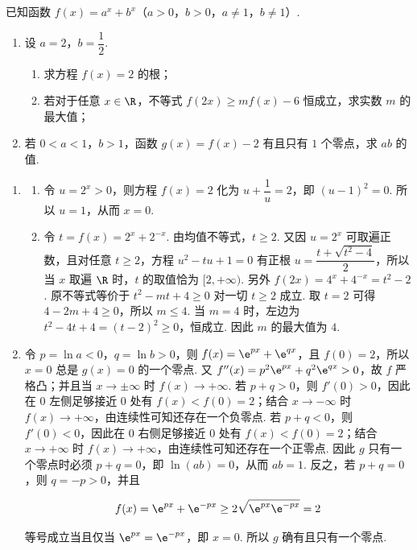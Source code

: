 \begin{problem}
已知函数 \(f(x)=a^x+b^x\)（\(a>0\)，\(b>0\)，\(a\ne1\)，\(b\ne1\)）.

\begin{enumerate}
\item 设 \(a=2\)，\(b=\dfrac12\).

\begin{enumerate}
\item 求方程 \(f(x)=2\) 的根；
\item 若对于任意 \(x\in\R\)，不等式 \(f(2x)\ge mf(x)-6\) 恒成立，求实数 \(m\) 的最大值；
\end{enumerate}

\item 若 \(0<a<1\)，\(b>1\)，函数 \(g(x)=f(x)-2\) 有且只有 \(1\) 个零点，求 \(ab\) 的值.
\end{enumerate}
\end{problem}

\begin{solution}
\begin{enumerate}
\item
\begin{enumerate}
\item 令 \(u=2^x>0\)，则方程 \(f(x)=2\) 化为 \(u+\dfrac1u=2\)，即 \((u-1)^2=0\). 所以 \(u=1\)，从而 \(x=0\).
\item 令 \(t=f(x)=2^x+2^{-x}\). 由均值不等式，\(t\ge2\). 又因 \(u=2^x\) 可取遍正数，且对任意 \(t\ge2\)，方程 \(u^2-tu+1=0\) 有正根 \(u=\dfrac{t+\sqrt{t^2-4}}2\)，所以当 \(x\) 取遍 \(\R\) 时，\(t\) 的取值恰为 \([2,+\infty)\). 另外 \(f(2x)=4^x+4^{-x}=t^2-2\). 原不等式等价于 \(t^2-mt+4\ge0\) 对一切 \(t\ge2\) 成立. 取 \(t=2\) 可得 \(4-2m+4\ge0\)，所以 \(m\le4\). 当 \(m=4\) 时，左边为 \(t^2-4t+4=(t-2)^2\ge0\)，恒成立. 因此 \(m\) 的最大值为 \(4\).
\end{enumerate}
\item 令 \(p=\ln a<0\)，\(q=\ln b>0\)，则 \(f(x)=\e^{px}+\e^{qx}\)，且 \(f(0)=2\)，所以 \(x=0\) 总是 \(g(x)=0\) 的一个零点. 又 \(f''(x)=p^2\e^{px}+q^2\e^{qx}>0\)，故 \(f\) 严格凸；并且当 \(x\to\pm\infty\) 时 \(f(x)\to+\infty\). 若 \(p+q>0\)，则 \(f'(0)>0\)，因此在 \(0\) 左侧足够接近 \(0\) 处有 \(f(x)<f(0)=2\)；结合 \(x\to-\infty\) 时 \(f(x)\to+\infty\)，由连续性可知还存在一个负零点. 若 \(p+q<0\)，则 \(f'(0)<0\)，因此在 \(0\) 右侧足够接近 \(0\) 处有 \(f(x)<f(0)=2\)；结合 \(x\to+\infty\) 时 \(f(x)\to+\infty\)，由连续性可知还存在一个正零点. 因此 \(g\) 只有一个零点时必须 \(p+q=0\)，即 \(\ln(ab)=0\)，从而 \(ab=1\). 反之，若 \(p+q=0\)，则 \(q=-p>0\)，并且

\[
f(x)=\e^{px}+\e^{-px}\ge2\sqrt{\e^{px}\e^{-px}}=2
\]

等号成立当且仅当 \(\e^{px}=\e^{-px}\)，即 \(x=0\). 所以 \(g\) 确有且只有一个零点.
\end{enumerate}
\end{solution}

